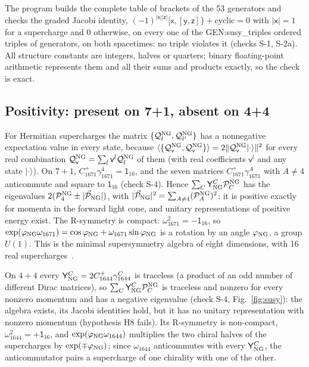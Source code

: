 The program builds the complete table of brackets of the 53 generators and checks the graded Jacobi
identity, $(-1)^{|\mathsf x||\mathsf z|}[\mathsf x,[\mathsf y,\mathsf z]\}+\text{cyclic}=0$ with $|\mathsf x|=1$ for a
supercharge and 0 otherwise, on every one of the {{GEN:susy_triples}} ordered triples of generators,
on both spacetimes: no triple violates it (checks S-1, S-2a). All structure constants are integers,
halves or quarters; binary floating-point arithmetic represents them and all their sums and
products exactly, so the check is exact.

\subsection{Positivity: present on 7+1, absent on 4+4}

For Hermitian supercharges the matrix $\{\mathcal Q^{\rm NG}_l,\mathcal Q^{\rm NG}_{l'}\}$ has a nonnegative
expectation value in every state, because $\langle\{\mathcal Q^{\rm NG}_{\mathsf v},\mathcal Q^{\rm NG}_{\mathsf v}\}\rangle=
2\lVert\mathcal Q^{\rm NG}_{\mathsf v}\lvert\cdot\rangle\rVert^2$ for every real combination $\mathcal Q^{\rm NG}_{\mathsf v}=\sum_l\mathsf v^l\mathcal Q^{\rm NG}_l$ of them (with real coefficients $\mathsf v^l$ and any state $\lvert\cdot\rangle$).
On $7+1$, $C^+_{1671}\gamma^4_{1671}=\mathsf 1_{16}$, and the seven matrices $C^+_{1671}\gamma^A_{1671}$ with
$A\neq4$ anticommute and square to $\mathsf 1_{16}$ (check S-4). Hence
$\sum_C\mathsf Y^C_{\rm NG}\mathcal P^{\rm NG}_C$ has the eigenvalues
$2(\mathcal P^{\rm NG}_4\pm\lvert\vec{\mathcal P}_{\rm NG}\rvert)$, with $\lvert\vec{\mathcal P}_{\rm NG}\rvert^2=
\sum_{A\neq4}(\mathcal P^{\rm NG}_A)^2$: it is positive exactly for momenta in the forward light cone, and
unitary representations of positive energy exist. The R-symmetry is compact: $\omega_{1671}^2=
-\mathsf 1_{16}$, so $\exp(\varphi_{\rm NG}\omega_{1671})=\cos\varphi_{\rm NG}+\omega_{1671}\sin\varphi_{\rm NG}$ is a rotation by an
angle $\varphi_{\rm NG}$, a group $U(1)$. This is the minimal supersymmetry algebra of eight dimensions, with 16 real
supercharges~\cite{Strathdee1987,KugoTownsend1983}.

On $4+4$ every $\mathsf Y^C_{\rm NG}=2C^+_{1644}\gamma^C_{1644}$ is traceless (a product of an odd number of
different Dirac matrices), so $\sum_C\mathsf Y^C_{\rm NG}\mathcal P^{\rm NG}_C$ is traceless and nonzero for
every nonzero momentum and has a negative eigenvalue (check S-4, Fig.~\ref{fig:susy}): the algebra
exists, its Jacobi identities hold, but it has no unitary representation with nonzero momentum
(hypothesis H8 fails). Its R-symmetry is non-compact, $\omega_{1644}^2=+\mathsf 1_{16}$, and
$\exp(\varphi_{\rm NG}\omega_{1644})$ multiplies the two chiral halves of the supercharges by $\exp(\mp\varphi_{\rm NG})$; since
$\omega_{1644}$ anticommutes with every $\mathsf Y^C_{\rm NG}$, the anticommutator pairs a supercharge of one
chirality with one of the other.


